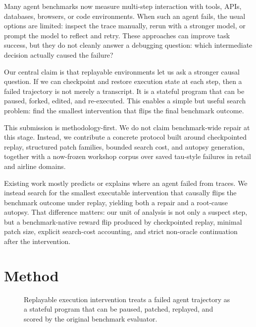\documentclass{article}
\begin{document}
Many agent benchmarks now measure multi-step interaction with tools, APIs,
databases, browsers, or code environments. When such an agent fails, the usual
options are limited: inspect the trace manually, rerun with a stronger model,
or prompt the model to reflect and retry. These approaches can improve task
success, but they do not cleanly answer a debugging question: which
intermediate decision actually caused the failure?

Our central claim is that replayable environments let us ask a stronger causal
question. If we can checkpoint and restore execution state at each step, then a
failed trajectory is not merely a transcript. It is a stateful program that
can be paused, forked, edited, and re-executed. This enables a simple but
useful search problem: find the smallest intervention that flips the final
benchmark outcome.

This submission is methodology-first. We do not claim benchmark-wide repair at
this stage. Instead, we contribute a concrete protocol built around
checkpointed replay, structured patch families, bounded search cost, and
autopsy generation, together with a now-frozen workshop corpus over saved
tau-style failures in retail and airline domains.

Existing work mostly predicts or explains where an agent failed from traces. We
instead search for the smallest executable intervention that causally flips the
benchmark outcome under replay, yielding both a repair and a root-cause
autopsy. That difference matters: our unit of analysis is not only a suspect
step, but a benchmark-native reward flip produced by checkpointed replay,
minimal patch size, explicit search-cost accounting, and strict non-oracle
continuation after the intervention.

\section{Method}

\begin{figure}[t]
\centering
{}
\caption{Replayable execution intervention treats a failed agent trajectory as a
stateful program that can be paused, patched, replayed, and scored by the
original benchmark evaluator.}
\label{fig:execution_intervention_pipeline}
\end{figure}
\end{document}
